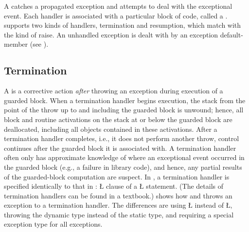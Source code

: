 \documentclass[openright,twoside]{report}
\begin{document}
A  catches a propagated exception and attempts to deal with the exceptional event.
Each handler is associated with a particular block of code, called a .
\uC supports two kinds of handlers, termination and resumption, which match with the kind of raise.
An unhandled exception is dealt with by an exception default-member (see ).


\subsection{Termination}

A  is a corrective action \emph{after} throwing an exception during execution of a guarded block.
When a termination handler begins execution, the stack from the point of the throw up to and including the guarded block is unwound;
hence, all block and routine activations on the stack at or below the guarded block are deallocated, including all objects contained in these activations.
After a termination handler completes, i.e., it does not perform another throw, control continues after the guarded block it is associated with.
A termination handler often only has approximate knowledge of where an exceptional event occurred in the guarded block (e.g., a failure in library code), and hence, any partial results of the guarded-block computation are suspect.
In \uC, a termination handler is specified identically to that in \CC: \LGinlinetrue\LGbegin\lgrinde\L{}\endlgrinde\LGend{} clause of a \LGinlinetrue\LGbegin\lgrinde\L{}\endlgrinde\LGend{} statement.
(The details of termination handlers can be found in a \CC textbook.)
 shows how \CC and \uC throws an exception to a termination handler.
The differences are using \LGinlinetrue\LGbegin\lgrinde\L{}\endlgrinde\LGend{} instead of \LGinlinetrue\LGbegin\lgrinde\L{}\endlgrinde\LGend{}, throwing the dynamic type instead of the static type, and requiring a special exception type for all exceptions.
\end{document}
